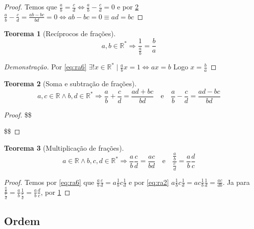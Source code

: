 \documentclass[
]{book}
\newtheorem{theorem}{Teorema}[chapter]
\theoremstyle{definition}
\theoremstyle{definition}
\theoremstyle{definition}
\theoremstyle{definition}
\theoremstyle{remark}
\begin{document}
\begin{proof}
Temos que \(\frac{a}{b}=\frac{c}{d} \Leftrightarrow \frac{a}{b} - \frac{c}{d} = 0\) e por \ref{thm:thmfracsum} \(\frac{a}{b} - \frac{c}{d} = \frac{ab - bc}{bd} = 0 \Leftrightarrow ab - bc = 0 \equiv ad = bc\)
\end{proof}

\begin{theorem}[Recíprocos de frações]
\protect\hypertarget{thm:thmfracinv}{}\label{thm:thmfracinv}\[
a, b \in \mathbb{R}^* \Rightarrow \frac{1}{\frac{a}{b}} = \frac{b}{a}
\]
\end{theorem}

\begin{proof}[Demonstração]
Por \eqref{eq:ra6} \(\exists!x \in \mathbb{R}^* \mid \frac{a}{b}x = 1 \Leftrightarrow ax = b\) Logo \(x = \frac{b}{a}\)
\end{proof}

\begin{theorem}[Soma e subtração de frações]
\protect\hypertarget{thm:thmfracsum}{}\label{thm:thmfracsum}\[
a,c \in \mathbb{R} \wedge b,d \in \mathbb{R}^* 
\Rightarrow
\frac{a}{b} + \frac{c}{d} = \frac{ad + bc}{bd} 
\quad \text{e} \quad 
\frac{a}{b} - \frac{c}{d} = \frac{ad - bc}{bd}
\]
\end{theorem}

\begin{proof}
\$\$

\$\$
\end{proof}

\begin{theorem}[Multiplicação de frações]
\protect\hypertarget{thm:thmfracmult}{}\label{thm:thmfracmult}\[
a \in \mathbb{R} \wedge b,c,d \in \mathbb{R}^* 
\Rightarrow
\frac{a}{b}\frac{c}{d} = \frac{ac}{bd} 
\quad \text{e} \quad
\frac{\frac{a}{b}}{\frac{c}{d}} = \frac{a}{b} \frac{d}{c}
\]
\end{theorem}

\begin{proof}
Temos por \eqref{eq:ra6} que \(\frac{a}{b}\frac{c}{d} = a\frac{1}{b}c\frac{1}{d}\) e por \eqref{eq:ra2} \(a\frac{1}{b}c\frac{1}{d} = ac\frac{1}{b}\frac{1}{d} = \frac{ac}{db}\). Ja para \(\frac{\frac{a}{b}}{\frac{c}{d}} = \frac{a}{b}\frac{1}{\frac{c}{d}} = \frac{a}{b} \frac{d}{c}\), por \ref{thm:thmfracinv}
\end{proof}

\subsection{Ordem}\label{ordem}
\end{document}
